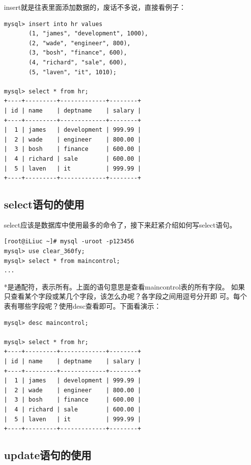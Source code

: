 insert就是往表里面添加数据的，废话不多说，直接看例子：

\small{
\begin{verbatim}
mysql> insert into hr values
       (1, "james", "development", 1000),
       (2, "wade", "engineer", 800),
       (3, "bosh", "finance", 600),
       (4, "richard", "sale", 600),
       (5, "laven", "it", 1010);

mysql> select * from hr;
+----+---------+-------------+--------+
| id | name    | deptname    | salary |
+----+---------+-------------+--------+
|  1 | james   | development | 999.99 | 
|  2 | wade    | engineer    | 800.00 | 
|  3 | bosh    | finance     | 600.00 | 
|  4 | richard | sale        | 600.00 | 
|  5 | laven   | it          | 999.99 | 
+----+---------+-------------+--------+
\end{verbatim}
}
\normalsize

\subsection{select语句的使用}

select应该是数据库中使用最多的命令了，接下来赶紧介绍如何写select语句。

\small{
\begin{verbatim}
[root@iLiuc ~]# mysql -uroot -p123456
mysql> use clear_360fy;
mysql> select * from maincontrol;
...
\end{verbatim}
}
\normalsize

*是通配符，表示所有。上面的语句意思是查看maincontrol表的所有字段。
如果只查看某个字段或某几个字段，该怎么办呢？各字段之间用逗号分开即
可。每个表有哪些字段呢？使用desc查看即可。下面看演示：

\small{
\begin{verbatim}
mysql> desc maincontrol;

mysql> select * from hr;
+----+---------+-------------+--------+
| id | name    | deptname    | salary |
+----+---------+-------------+--------+
|  1 | james   | development | 999.99 | 
|  2 | wade    | engineer    | 800.00 | 
|  3 | bosh    | finance     | 600.00 | 
|  4 | richard | sale        | 600.00 | 
|  5 | laven   | it          | 999.99 | 
+----+---------+-------------+--------+
\end{verbatim}
}
\normalsize

\subsection{update语句的使用}

